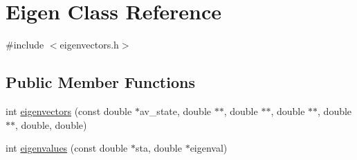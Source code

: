\hypertarget{classEigen}{}\section{Eigen Class Reference}
\label{classEigen}


{\ttfamily \#include $<$eigenvectors.\+h$>$}

\subsection*{Public Member Functions}
\begin{DoxyCompactItemize}
\item 
int \hyperlink{classEigen_a3b67128c27ba136235b089ec06a5f8d3}{eigenvectors} (const double $\ast$av\+\_\+state, double $\ast$$\ast$, double $\ast$$\ast$, double $\ast$$\ast$, double $\ast$$\ast$, double, double)
\item 
int \hyperlink{classEigen_a4a45e1dac3c8073ec21e3dcc8ca0443e}{eigenvalues} (const double $\ast$sta, double $\ast$eigenval)
\end{DoxyCompactItemize}
